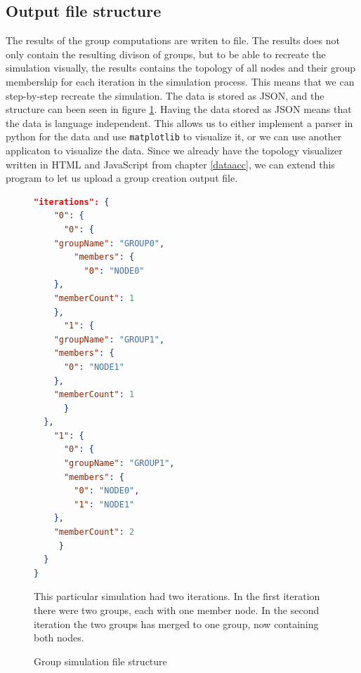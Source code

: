 \subsection{Output file structure}
The results of the group computations are writen to file. The results does not only contain the resulting divison of groups, but to be able to recreate the simulation
visually, the results contains the topology of all nodes and their group membership for each iteration in the simulation process. This means that we can step-by-step
recreate the simulation. The data is stored as JSON, and the structure can been seen in figure \ref{fig:jsongroup}.
Having the data stored as JSON means that the data is language independent. This allows us to either implement a parser in python for the data and use \verb|matplotlib| to visualize it,
or we can use another applicaton to visualize the data. Since we already have the topology visualizer
written in HTML and JavaScript from chapter \ref{dataacc}, we can extend this program to let us upload a group creation output file. 
\begin{figure}

\begin{minipage}{\linewidth}
\begin{lstlisting}[language=json]
  "iterations": {
    "0": {
      "0": {
	"groupName": "GROUP0",
        "members": {
          "0": "NODE0"
	},
	"memberCount": 1
    },
      "1": {
	"groupName": "GROUP1",
	"members": {
	  "0": "NODE1"
	},
	"memberCount": 1
      }
  },
    "1": {
      "0": {
	  "groupName": "GROUP1",
	  "members": {
	    "0": "NODE0",
	    "1": "NODE1"
	},
	"memberCount": 2
     }
  }
}
\end{lstlisting}
\end{minipage}

\caption{Group simulation file structure}
\medskip
\small
This particular simulation had two iterations. In the first iteration there were two groups, each with one member node. In the second iteration the two groups has merged to one group, now
containing both nodes. 
\label{fig:jsongroup}
\end{figure}




